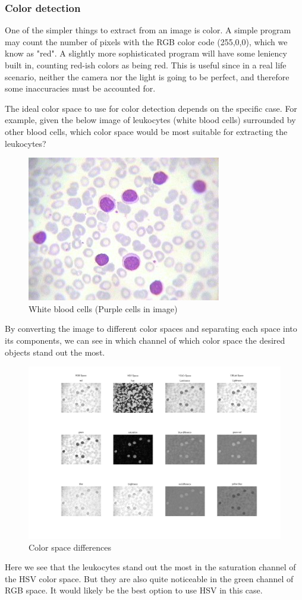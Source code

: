 			\subsubsection{Color detection}
			
			One of the simpler things to extract from an image is color. A simple program may count the number of pixels with the RGB color code (255,0,0), which we know as "red". A slightly more sophisticated program will have some leniency built in, counting red-ish colors as being red. This is useful since in a real life scenario, neither the camera nor the light is going to be perfect, and therefore some inaccuracies must be accounted for. 
			
			The ideal color space to use for color detection depends on the specific case. 
			For example, given the below image of leukocytes (white blood cells) surrounded by other blood cells, which color space would be most suitable for extracting the leukocytes?
			\begin{figure}[H]
				\centering
				\includegraphics[width=0.2\linewidth]{figure/Analysis/leukocytes.jpg}
				\caption{White blood cells (Purple cells in image)}
				\label{fig:leukocytes}
			\end{figure}
			
			By converting the image to different color spaces and separating each space into its components, we can see in which channel of which color space the desired objects stand out the most. 
			
					\begin{figure}[H]
				\centering
				\includegraphics[width=\linewidth]{figure/Analysis/differences.jpg}
				\caption{Color space differences}
				\label{fig:differences}
			\end{figure}
		Here we see that the leukocytes stand out the most in the saturation channel of the HSV color space. But they are also quite noticeable in the green channel of RGB space. It would likely be the best option to use HSV in this case. 
		
